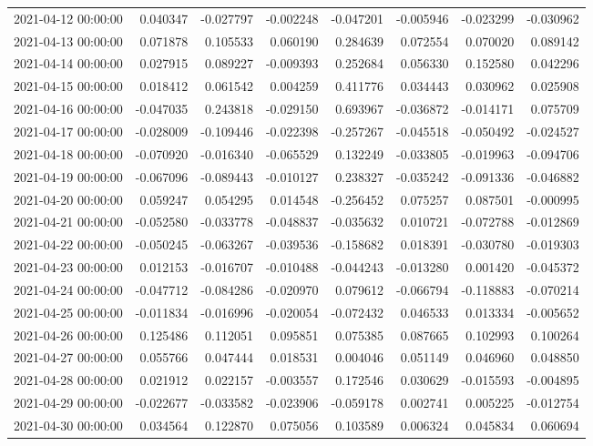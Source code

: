 \begin{tabular}{lrrrrrrr}
2021-04-12 00:00:00 & 0.040347 & -0.027797 & -0.002248 & -0.047201 & -0.005946 & -0.023299 & -0.030962 \\
2021-04-13 00:00:00 & 0.071878 & 0.105533 & 0.060190 & 0.284639 & 0.072554 & 0.070020 & 0.089142 \\
2021-04-14 00:00:00 & 0.027915 & 0.089227 & -0.009393 & 0.252684 & 0.056330 & 0.152580 & 0.042296 \\
2021-04-15 00:00:00 & 0.018412 & 0.061542 & 0.004259 & 0.411776 & 0.034443 & 0.030962 & 0.025908 \\
2021-04-16 00:00:00 & -0.047035 & 0.243818 & -0.029150 & 0.693967 & -0.036872 & -0.014171 & 0.075709 \\
2021-04-17 00:00:00 & -0.028009 & -0.109446 & -0.022398 & -0.257267 & -0.045518 & -0.050492 & -0.024527 \\
2021-04-18 00:00:00 & -0.070920 & -0.016340 & -0.065529 & 0.132249 & -0.033805 & -0.019963 & -0.094706 \\
2021-04-19 00:00:00 & -0.067096 & -0.089443 & -0.010127 & 0.238327 & -0.035242 & -0.091336 & -0.046882 \\
2021-04-20 00:00:00 & 0.059247 & 0.054295 & 0.014548 & -0.256452 & 0.075257 & 0.087501 & -0.000995 \\
2021-04-21 00:00:00 & -0.052580 & -0.033778 & -0.048837 & -0.035632 & 0.010721 & -0.072788 & -0.012869 \\
2021-04-22 00:00:00 & -0.050245 & -0.063267 & -0.039536 & -0.158682 & 0.018391 & -0.030780 & -0.019303 \\
2021-04-23 00:00:00 & 0.012153 & -0.016707 & -0.010488 & -0.044243 & -0.013280 & 0.001420 & -0.045372 \\
2021-04-24 00:00:00 & -0.047712 & -0.084286 & -0.020970 & 0.079612 & -0.066794 & -0.118883 & -0.070214 \\
2021-04-25 00:00:00 & -0.011834 & -0.016996 & -0.020054 & -0.072432 & 0.046533 & 0.013334 & -0.005652 \\
2021-04-26 00:00:00 & 0.125486 & 0.112051 & 0.095851 & 0.075385 & 0.087665 & 0.102993 & 0.100264 \\
2021-04-27 00:00:00 & 0.055766 & 0.047444 & 0.018531 & 0.004046 & 0.051149 & 0.046960 & 0.048850 \\
2021-04-28 00:00:00 & 0.021912 & 0.022157 & -0.003557 & 0.172546 & 0.030629 & -0.015593 & -0.004895 \\
2021-04-29 00:00:00 & -0.022677 & -0.033582 & -0.023906 & -0.059178 & 0.002741 & 0.005225 & -0.012754 \\
2021-04-30 00:00:00 & 0.034564 & 0.122870 & 0.075056 & 0.103589 & 0.006324 & 0.045834 & 0.060694 \\

\end{tabular}
